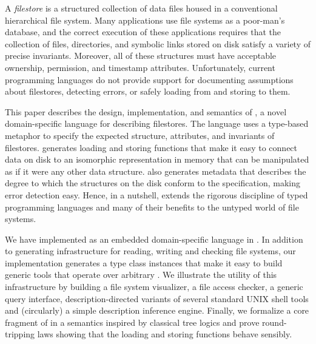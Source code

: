 A {\em filestore} is a structured collection of data files housed in a
conventional hierarchical file system. Many applications use file
systems as a poor-man's database, and the correct execution of these
applications requires that the collection of files, directories, and
symbolic links stored on disk satisfy a variety of precise
invariants. Moreover, all of these structures must have acceptable
ownership, permission, and timestamp attributes. Unfortunately,
current programming languages do not provide support for documenting
assumptions about filestores, detecting errors, or safely loading from
and storing to them.

This paper describes the design, implementation, and semantics of
\forest{}, a novel domain-specific language for describing
filestores. The language uses a type-based metaphor to specify the
expected structure, attributes, and invariants of filestores.
\forest{} generates loading and storing functions that make it easy to
connect data on disk to an isomorphic representation in memory that
can be manipulated as if it were any other data structure.  \forest{}
also generates metadata that describes the degree to which the
structures on the disk conform to the specification, making error
detection easy. Hence, in a nutshell, \forest{} extends the
rigorous discipline of typed 
programming languages and many of their benefits to the untyped 
world of file systems.

We have implemented \forest{} as an embedded domain-specific language
in \haskell{}. In addition to generating infrastructure for reading,
writing and checking file systems, our implementation generates a
type class instances that make it easy to build generic tools that
operate over arbitrary \filestores.  We illustrate the utility of
this infrastructure by building a file system visualizer, a file access
checker, a generic query interface, description-directed variants of 
several standard UNIX shell tools and (circularly) a simple \forest{}
description inference engine.   Finally, we formalize a core fragment 
of \forest{} in a
semantics inspired by classical tree logics and prove round-tripping
laws showing that the loading and storing functions behave sensibly.
